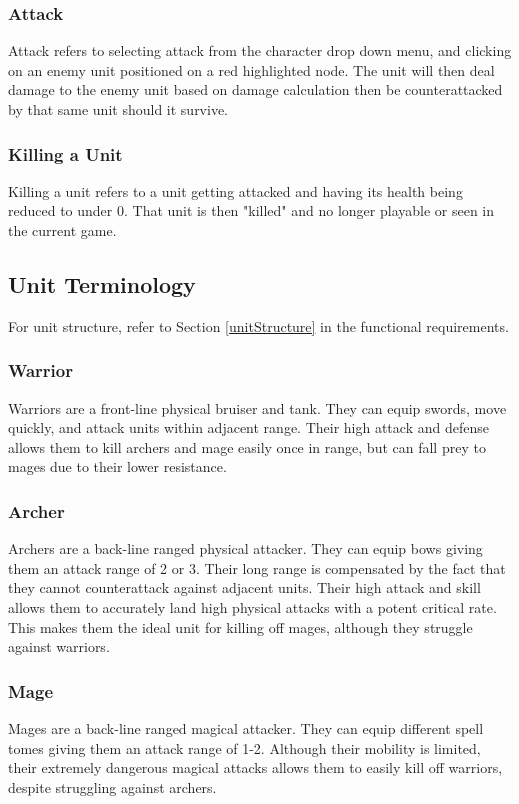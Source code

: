 \documentclass{article}
\begin{document}
\subsubsection{Attack}
Attack refers to selecting attack from the character drop down menu, and clicking on an enemy unit positioned on a red highlighted node. The unit will then deal damage to the enemy unit based on damage calculation then be counterattacked by that same unit should it survive.

\subsubsection{Killing a Unit}
Killing a unit refers to a unit getting attacked and having its health being reduced to under 0. That unit is then "killed" and no longer playable or seen in the current game.

\subsection{Unit Terminology} \label{UnitType}

For unit structure, refer to Section \ref{unitStructure} in the functional requirements.

\subsubsection{Warrior}
Warriors are a front-line physical bruiser and tank. They can equip swords, move quickly, and attack units within adjacent range. Their high attack and defense allows them to kill archers and mage easily once in range, but can fall prey to mages due to their lower resistance.

\subsubsection{Archer}
Archers are a back-line ranged physical attacker. They can equip bows giving them an attack range of 2 or 3. Their long range is compensated by the fact that they cannot counterattack against adjacent units. Their high attack and skill allows them to accurately land high physical attacks with a potent critical rate. This makes them the ideal unit for killing off mages, although they struggle against warriors.

\subsubsection{Mage}
Mages are a back-line ranged magical attacker. They can equip different spell tomes giving them an attack range of 1-2. Although their mobility is limited, their extremely dangerous magical attacks allows them to easily kill off warriors, despite struggling against archers.
\end{document}
